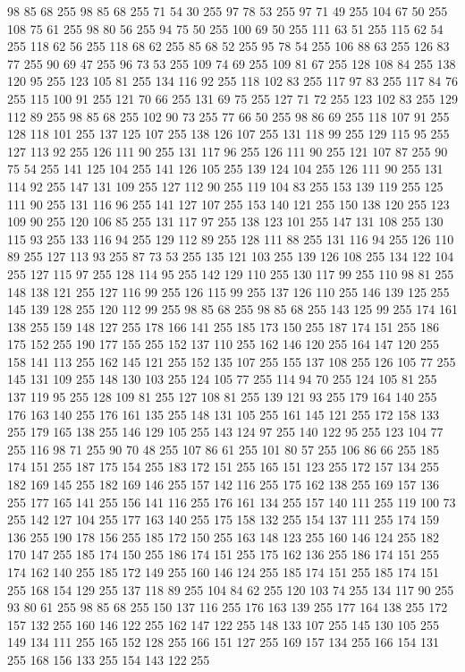 98 85 68 255 98 85 68 255 71 54 30 255 97 78 53 255 97 71 49 255 104 67 50 255 108 75 61 255 98 80 56 255 94 75 50 255 100 69 50 255 111 63 51 255 115 62 54 255 118 62 56 255 118 68 62 255 85 68 52 255 95 78 54 255 106 88 63 255 126 83 77 255 90 69 47 255 96 73 53 255 109 74 69 255 109 81 67 255 128 108 84 255 138 120 95 255 123 105 81 255 134 116 92 255 118 102 83 255 117 97 83 255 117 84 76 255 115 100 91 255 121 70 66 255 131 69 75 255 127 71 72 255 123 102 83 255 129 112 89 255 98 85 68 255 102 90 73 255 77 66 50 255 98 86 69 255 118 107 91 255 128 118 101 255 137 125 107 255 138 126 107 255 131 118 99 255 129 115 95 255 127 113 92 255 126 111 90 255 131 117 96 255 126 111 90 255 121 107 87 255 90 75 54 255 141 125 104 255 141 126 105 255 139 124 104 255 126 111 90 255 131 114 92 255 147 131 109 255 127 112 90 255 119 104 83 255 153 139 119 255 125 111 90 255 131 116 96 255 141 127 107 255 153 140 121 255
150 138 120 255 123 109 90 255 120 106 85 255 131 117 97 255 138 123 101 255 147 131 108 255 130 115 93 255 133 116 94 255 129 112 89 255 128 111 88 255 131 116 94 255 126 110 89 255 127 113 93 255 87 73 53 255 135 121 103 255 139 126 108 255 134 122 104 255 127 115 97 255 128 114 95 255 142 129 110 255 130 117 99 255 110 98 81 255 148 138 121 255 127 116 99 255 126 115 99 255 137 126 110 255 146 139 125 255 145 139 128 255 120 112 99 255 98 85 68 255 98 85 68 255 143 125 99 255 174 161 138 255 159 148 127 255 178 166 141 255 185 173 150 255 187 174 151 255 186 175 152 255 190 177 155 255 152 137 110 255 162 146 120 255 164 147 120 255 158 141 113 255 162 145 121 255 152 135 107 255 155 137 108 255 126 105 77 255 145 131 109 255 148 130 103 255 124 105 77 255 114 94 70 255 124 105 81 255 137 119 95 255 128 109 81 255 127 108 81 255 139 121 93 255 179 164 140 255 176 163 140 255 176 161 135 255 148 131 105 255 161 145 121 255 172 158 133 255 179 165 138 255 146 129 105 255
143 124 97 255 140 122 95 255 123 104 77 255 116 98 71 255 90 70 48 255 107 86 61 255 101 80 57 255 106 86 66 255 185 174 151 255 187 175 154 255 183 172 151 255 165 151 123 255 172 157 134 255 182 169 145 255 182 169 146 255 157 142 116 255 175 162 138 255 169 157 136 255 177 165 141 255 156 141 116 255 176 161 134 255 157 140 111 255 119 100 73 255 142 127 104 255 177 163 140 255 175 158 132 255 154 137 111 255 174 159 136 255 190 178 156 255 185 172 150 255 163 148 123 255 160 146 124 255 182 170 147 255 185 174 150 255 186 174 151 255 175 162 136 255 186 174 151 255 174 162 140 255 185 172 149 255 160 146 124 255 185 174 151 255 185 174 151 255 168 154 129 255 137 118 89 255 104 84 62 255 120 103 74 255 134 117 90 255 93 80 61 255 98 85 68 255 150 137 116 255 176 163 139 255 177 164 138 255 172 157 132 255 160 146 122 255 162 147 122 255 148 133 107 255 145 130 105 255 149 134 111 255 165 152 128 255 166 151 127 255 169 157 134 255 166 154 131 255 168 156 133 255 154 143 122 255
